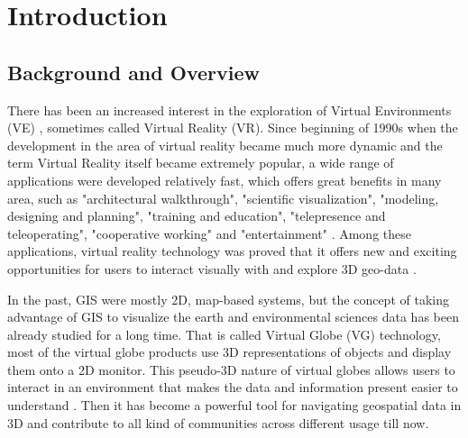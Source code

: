\label{chapter-introduction}
\chapter{Introduction}

\section{Background and Overview}

There has been an increased interest in the exploration of Virtual Environments (VE) \cite{huang.java-cgi-vr.2002}, sometimes called Virtual Reality (VR). Since beginning of 1990s when the development in the area of virtual reality became much more dynamic and the term Virtual Reality itself became extremely popular, a wide range of applications were developed relatively fast, which offers great benefits in many area, such as "architectural walkthrough", "scientific visualization", "modeling, designing and planning", "training and education", "telepresence and teleoperating", "cooperative working" and "entertainment" \cite{mazuryk.vr.1996}. Among these applications, virtual reality technology was proved that it offers new and exciting opportunities for users to interact visually with and explore 3D geo-data \cite{huang.java-cgi-vr.2002}.

In the past, GIS were mostly 2D, map-based systems, but the concept of taking advantage of GIS to visualize the earth and environmental sciences data has been already studied for a long time. That is called Virtual Globe (VG) technology, most of the virtual globe products use 3D representations of objects and display them onto a 2D monitor. This pseudo-3D nature of virtual globes allows users to interact in an environment that makes the data and information present easier to understand \cite{tuttle.virtual-globes.2008}. Then it has become a powerful tool for navigating geospatial data in 3D and contribute to all kind of communities across different usage till now. 

